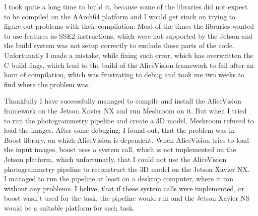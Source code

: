 I took quite a long time to build it, because some of the libraries did not expect to be compiled on the AArch64 platform and I would get stuck on trying to figure out  problems with their compilation.
Most of the times the libraries wanted to use features as SSE2 instructions, which were not supported by the Jetson and the build system was not setup correctly to exclude these parts of the code.
Unfortunatly I made a mistake, while fixing such error, which has overwritten the C build flags, which lead to the build of the AliceVision framework to fail after an hour of compilation, which was frustrating to debug and took me two weeks to find where the problem was.

Thankfully I have successfully managed to compile and install the AliceVision framework on the Jetson Xavier NX and run Meshroom on it.
But when I tried to run the photogrammetry pipeline and create a 3D model, Meshroom refused to load the images.
After some debuging, I found out, that the problem was in Boost library, on which AliceVision is dependent.
When AliceVision tries to load the input images, boost uses a system call, which is not implemented on the Jetson platform, which unfortunatly, that I could not use the AliceVision photogrammetry pipeline to reconstruct the 3D model on the Jetson Xavier NX.
I managed to run the pipeline at least on a desktop computer, where it ran without any problems.
I belive, that if these system calls were implemented, or boost wasn't used for the task, the pipeline would run and the Jetson Xavier NS would be a suitable platform for such task.








\endinput